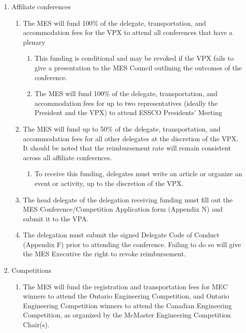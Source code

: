 \begin{enumerate}
 \item
  Affiliate conferences
  \begin{enumerate}
   \item
    The MES will fund 100\% of the delegate, transportation, and
    accommodation fees for the VPX to attend all conferences that have a
    plenary

    \begin{enumerate}
     \item
      This funding is conditional and may be revoked if the VPX fails to
      give a presentation to the MES Council outlining the outcomes of
      the conference.
     \item
      The MES will fund 100\% of the delegate, transportation, and
      accommodation fees for up to two representatives (ideally the
      President and the VPX) to attend ESSCO Presidents' Meeting
    \end{enumerate}
   \item
    The MES will fund up to 50\% of the delegate, transportation, and
    accommodation fees for all other delegates at the discretion of the
    VPX. It should be noted that the reimbursement rate will remain
    consistent across all affiliate conferences.

    \begin{enumerate}
     \item
      To receive this funding, delegates must write an article or
      organize an event or activity, up to the discretion of the VPX.
    \end{enumerate}
   \item
    The head delegate of the delegation receiving funding must fill out
    the MES Conference/Competition Application form (Appendix N) and
    submit it to the VPA.
   \item
    The delegation must submit the signed Delegate Code of Conduct
    (Appendix F) prior to attending the conference. Failing to do so
    will give the MES Executive the right to revoke reimbursement.
  \end{enumerate}
 \item
  Competitions

  \begin{enumerate}
   \item
    The MES will fund the registration and transportation fees for MEC
    winners to attend the Ontario Engineering Competition, and Ontario
    Engineering Competition winners to attend the Canadian Engineering
    Competition, as organized by the McMaster Engineering Competition
    Chair(s).


\end{enumerate}
\end{enumerate}
